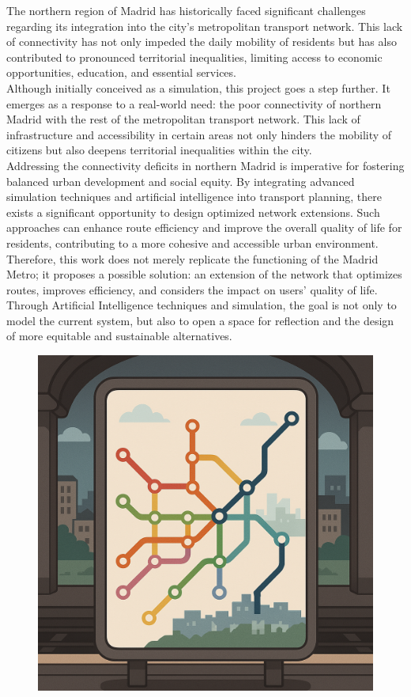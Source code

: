 \documentclass[a4paper,11pt,oneside]{book}
\begin{document}
The northern region of Madrid has historically faced significant challenges regarding its integration into the city's metropolitan transport network. This lack of connectivity has not only impeded the daily mobility of residents but has also contributed to pronounced territorial inequalities, limiting access to economic opportunities, education, and essential services.
~\\[0,5cm]
Although initially conceived as a simulation, this project goes a step further. It emerges as a response to a real-world need: the poor connectivity of northern Madrid with the rest of the metropolitan transport network. This lack of infrastructure and accessibility in certain areas not only hinders the mobility of citizens but also deepens territorial inequalities within the city.
~\\[0,5cm]
Addressing the connectivity deficits in northern Madrid is imperative for fostering balanced urban development and social equity. By integrating advanced simulation techniques and artificial intelligence into transport planning, there exists a significant opportunity to design optimized network extensions. Such approaches can enhance route efficiency and improve the overall quality of life for residents, contributing to a more cohesive and accessible urban environment.
~\\[0,5cm]
Therefore, this work does not merely replicate the functioning of the Madrid Metro; it proposes a possible solution: an extension of the network that optimizes routes, improves efficiency, and considers the impact on users' quality of life. Through Artificial Intelligence techniques and simulation, the goal is not only to model the current system, but also to open a space for reflection and the design of more equitable and sustainable alternatives.
\begin{figure}
        \centering
        \vspace{-20 cm} 
        \includegraphics[width=0.49
        \linewidth]{image.png}
    \end{figure}
\end{document}
